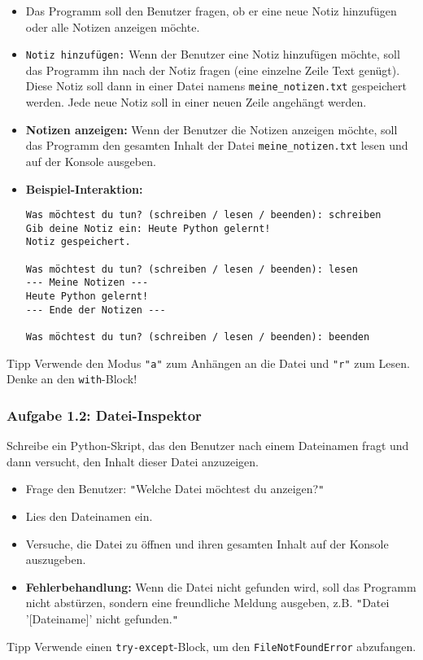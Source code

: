 \documentclass[11pt, a4paper]{article}
\begin{document}
\begin{itemize}
    \item Das Programm soll den Benutzer fragen, ob er eine neue Notiz hinzufügen oder alle Notizen anzeigen möchte.
    \item \texttt{Notiz hinzufügen:} Wenn der Benutzer eine Notiz hinzufügen möchte, soll das Programm ihn nach der Notiz fragen (eine einzelne Zeile Text genügt). Diese Notiz soll dann in einer Datei namens \texttt{meine\_notizen.txt} gespeichert werden. Jede neue Notiz soll in einer neuen Zeile angehängt werden.
    \item \textbf{Notizen anzeigen:} Wenn der Benutzer die Notizen anzeigen möchte, soll das Programm den gesamten Inhalt der Datei \texttt{meine\_notizen.txt} lesen und auf der Konsole ausgeben.
    \item \textbf{Beispiel-Interaktion:}
\begin{verbatim}
Was möchtest du tun? (schreiben / lesen / beenden): schreiben
Gib deine Notiz ein: Heute Python gelernt!
Notiz gespeichert.

Was möchtest du tun? (schreiben / lesen / beenden): lesen
--- Meine Notizen ---
Heute Python gelernt!
--- Ende der Notizen ---

Was möchtest du tun? (schreiben / lesen / beenden): beenden
\end{verbatim}
\end{itemize}
\begin{infoblock}{Tipp}
Verwende den Modus \texttt{\texttt{"}a\texttt{"}} zum Anhängen an die Datei und \texttt{\texttt{"}r\texttt{"}} zum Lesen. Denke an den \texttt{with}-Block!
\end{infoblock}

\subsubsection*{Aufgabe 1.2: Datei-Inspektor}
Schreibe ein Python-Skript, das den Benutzer nach einem Dateinamen fragt und dann versucht, den Inhalt dieser Datei anzuzeigen.

\begin{itemize}
    \item Frage den Benutzer: \texttt{"}Welche Datei möchtest du anzeigen?\texttt{"}
    \item Lies den Dateinamen ein.
    \item Versuche, die Datei zu öffnen und ihren gesamten Inhalt auf der Konsole auszugeben.
    \item \textbf{Fehlerbehandlung:} Wenn die Datei nicht gefunden wird, soll das Programm nicht abstürzen, sondern eine freundliche Meldung ausgeben, z.B. \texttt{"}Datei '[Dateiname]' nicht gefunden.\texttt{"}
\end{itemize}
\begin{infoblock}{Tipp}
Verwende einen \texttt{try-except}-Block, um den \texttt{FileNotFoundError} abzufangen.
\end{infoblock}
\end{document}
